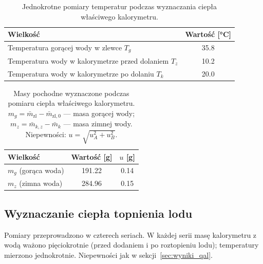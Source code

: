 \documentclass[12pt, a4paper]{article}
\begin{document}
\begin{table}[H]
\centering
\caption{Jednokrotne pomiary temperatur podczas wyznaczania ciepła właściwego kalorymetru.}\label{tab:qal_temp}
\begin{tabular}{l S[table-format=2.1]}
\toprule
Wielkość & {Wartość [\unit{\degreeCelsius}]} \\
\midrule
Temperatura gorącej wody w zlewce $T_g$                   & 35.8 \\
Temperatura wody w kalorymetrze przed dolaniem $T_z$       & 10.2 \\
Temperatura wody w kalorymetrze po dolaniu $T_k$           & 20.0 \\
\bottomrule
\end{tabular}
\end{table}

\begin{table}[H]
\centering
\caption{Masy pochodne wyznaczone podczas pomiaru ciepła właściwego kalorymetru.
         $m_g = \bar{m}_{\mathrm{zl}} - \bar{m}_{\mathrm{zl},0}$ --- masa gorącej wody;
         $m_z = \bar{m}_{k,z} - \bar{m}_k$ --- masa zimnej wody.
         Niepewności: $u = \sqrt{u_A^2 + u_B^2}$.}\label{tab:qal_mg_mz}
\begin{tabular}{l S[table-format=3.2] S[table-format=1.2]}
\toprule
Wielkość & {Wartość [\unit{\gram}]} & {$u$ [\unit{\gram}]} \\
\midrule
$m_g$ (gorąca woda)  & 191.22 & 0.14 \\
$m_z$ (zimna woda)   & 284.96 & 0.15 \\
\bottomrule
\end{tabular}
\end{table}

\subsection{Wyznaczanie ciepła topnienia lodu}\label{sec:wyniki_qt}

Pomiary przeprowadzono w czterech seriach. W każdej serii masę kalorymetru z wodą ważono
pięciokrotnie (przed dodaniem i po roztopieniu lodu); temperatury mierzono jednokrotnie.
Niepewności jak w sekcji~\ref{sec:wyniki_qal}.
\end{document}
